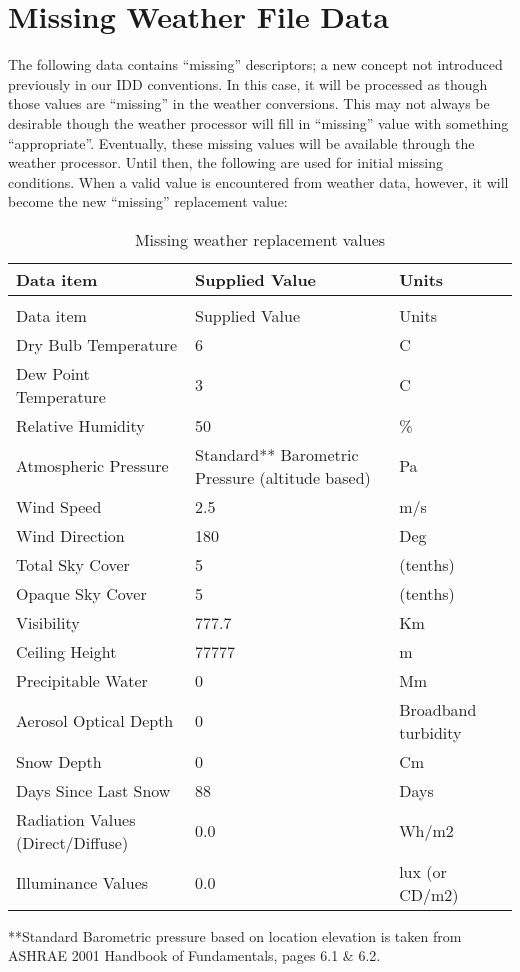 \section{Missing Weather File Data}\label{missing-weather-file-data}

The following data contains ``missing'' descriptors; a new concept not introduced previously in our IDD conventions. In this case, it will be processed as though those values are ``missing'' in the weather conversions. This may not always be desirable though the weather processor will fill in ``missing'' value with something ``appropriate''. Eventually, these missing values will be available through the weather processor. Until then, the following are used for initial missing conditions. When a valid value is encountered from weather data, however, it will become the new ``missing'' replacement value:

\begin{longtable}[c]{p{1.83in}p{2.67in}p{1.5in}}
\caption{Missing weather replacement values \label{table:missing-weather-replacement-values}} \tabularnewline
\toprule 
Data item & Supplied Value & Units \tabularnewline \midrule
\endfirsthead

\caption[]{Missing weather replacement values} \tabularnewline
\toprule 
Data item & Supplied Value & Units \tabularnewline \midrule
\endhead

Dry Bulb Temperature & 6 & C \tabularnewline
Dew Point Temperature & 3 & C \tabularnewline
Relative Humidity & 50 & \% \tabularnewline
Atmospheric Pressure & Standard** Barometric Pressure (altitude based) & Pa \tabularnewline
Wind Speed & 2.5 & m/s \tabularnewline
Wind Direction & 180 & Deg \tabularnewline
Total Sky Cover & 5 & (tenths) \tabularnewline
Opaque Sky Cover & 5 & (tenths) \tabularnewline
Visibility & 777.7 & Km \tabularnewline
Ceiling Height & 77777 & m \tabularnewline
Precipitable Water & 0 & Mm \tabularnewline
Aerosol Optical Depth & 0 & Broadband turbidity \tabularnewline
Snow Depth & 0 & Cm \tabularnewline
Days Since Last Snow & 88 & Days \tabularnewline
Radiation Values (Direct/Diffuse) & 0.0 & Wh/m2 \tabularnewline
Illuminance Values & 0.0 & lux (or CD/m2) \tabularnewline
\bottomrule
\end{longtable}

**Standard Barometric pressure based on location elevation is taken from ASHRAE 2001 Handbook of Fundamentals, pages 6.1 \& 6.2.

